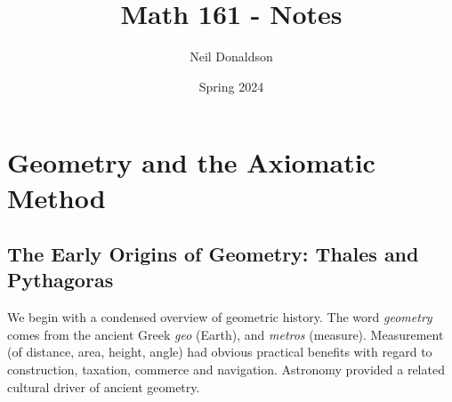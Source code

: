\thispagestyle{empty}
\graphicspath{{1axioms/asy/}}

\title{Math 161 - Notes}
\author{Neil Donaldson}
\date{Spring 2024}
\maketitle


\section{Geometry and the Axiomatic Method}\label{chap:axioms}

\subsection{The Early Origins of Geometry: Thales and Pythagoras}\label{sec:thales}


We begin with a condensed overview of geometric history. The word \emph{geometry} comes from the ancient Greek \emph{geo} (Earth), and \emph{metros} (measure). Measurement (of distance, area, height, angle) had obvious practical benefits with regard to construction, taxation, commerce and navigation. Astronomy provided a related cultural driver of ancient geometry.

